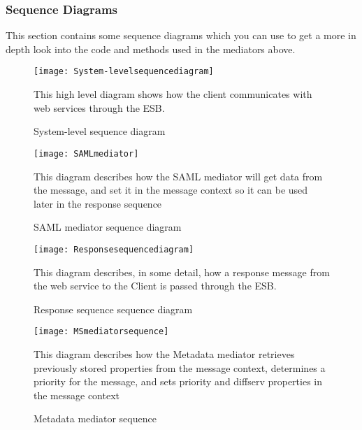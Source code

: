     \subsubsection{Sequence Diagrams}\label{Server Sequence Diagrams}
    This section contains some sequence diagrams which you can use to get a more in depth look into the code and methods used in the mediators above.
    
        \begin{figure}[H]
            \centering
            \texttt{[image: System-levelsequencediagram]}
            \caption{System-level sequence diagram}
            This high level diagram shows how the client communicates with web services through the ESB.
            \label{fig:System-levelsequencediagram}
        \end{figure}
        
        \begin{figure}[H]
            \centering
            \texttt{[image: SAMLmediator]}
            \caption{SAML mediator sequence diagram}
            This diagram describes how the SAML mediator will get data from the message, and set it in the message context so it can be used later in the response sequence
            \label{fig:SAMLmediator}
        \end{figure}
        
        \begin{figure}[H]
            \texttt{[image: Responsesequencediagram]}
            \caption{Response sequence sequence diagram}
            This diagram describes, in some detail, how a response message from the web service to the Client is passed through the ESB.
            \label{fig:Responsesequencediagram}
        \end{figure}
    
        \begin{figure}[H]
            \centering
            \texttt{[image: MSmediatorsequence]}
            \caption{Metadata mediator sequence}
            This diagram describes how the Metadata mediator retrieves previously stored properties from the message context, determines a priority for the message, and sets priority and diffserv properties in the message context
            \label{fig:MSmediatorsequence}
        \end{figure}
        
